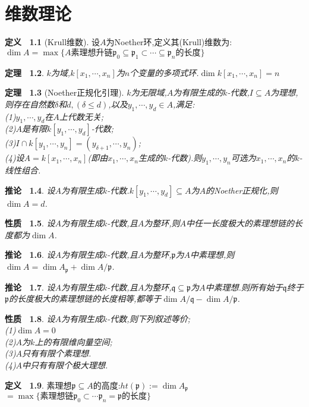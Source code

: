 \documentclass[b5paper,oneside]{ctexbook}
\newcommand{\mf}[1]{\mathfrak{#1}}
\theoremstyle{plain}
\newtheorem{thm}{定理~}[chapter]
\newtheorem{prop}[thm]{性质~}
\newtheorem{cor}[thm]{推论~}
\theoremstyle{definition}
\newtheorem{defn}[thm]{定义~}
\begin{document}
\chapter{维数理论}
\begin{defn}[Krull维数]设$A$为Noether环,定义其(Krull)维数为:\\
$\dim A=\max\{A\text{素理想升链}\mf{p}_0\subseteq \mf{p}_1\subset \cdots\subseteq \mf{p}_n\text{的长度}\}$
\end{defn}
\begin{thm}$k$为域,$k[x_1,\cdots,x_n]$为$n$个变量的多项式环.$\dim k[x_1,\cdots,x_n]=n$
\end{thm}
\begin{thm}[Noether正规化引理]$k$为无限域,$A$为有限生成的$k$-代数,$I\subseteq A$为理想,则存在自然数$\delta$和$d,(\delta\leq d)$,以及$y_1,\cdots,y_d\in A$,满足:\\
(1)$y_1,\cdots,y_d$在$A$上代数无关;\\
(2)$A$是有限$k[y_1,\cdots,y_d]$-代数;\\
(3)$I\cap k[y_1,\cdots,y_n]=(y_{\delta+1},\cdots,y_n)$;\\
(4)设$A=k[x_1,\cdots,x_n]$(即由$x_1,\cdots,x_n$生成的$k$-代数).则$y_1,\cdots,y_n$可选为$x_1,\cdots,x_n$的$k$-线性组合.
\end{thm}
\begin{cor}设$A$为有限生成$k$-代数.$k[y_1,\cdots,y_d]\subseteq A$为$A$的Noether正规化,则$\dim A=d$.
\end{cor}
\begin{prop}设$A$为有限生成$k$-代数,且$A$为整环,则$A$中任一长度极大的素理想链的长度都为$\dim A$.
\end{prop}
\begin{cor}设$A$为有限生成$k$-代数,且$A$为整环,$\mf{p}$为$A$中素理想,则$\dim A=\dim A_{\mf{p}}+\dim A/\mf{p}$.
\end{cor}
\begin{cor}设$A$为有限生成$k$-代数,且$A$为整环,$\mf{q}\subseteq \mf{p}$为$A$中素理想.则所有始于$\mf{q}$终于$\mf{p}$的长度极大的素理想链的长度相等,都等于$\dim A/\mf{q}-\dim A/\mf{p}$.
\end{cor}
\begin{prop}设$A$为有限生成$k$-代数,则下列叙述等价;\\
(1)$\dim A=0$\\
(2)$A$为$k$上的有限维向量空间;\\
(3)$A$只有有限个素理想.\\
(4)$A$中只有有限个极大理想.
\end{prop}
\begin{defn}素理想$\mf{p}\subseteq A$的高度:$ht(\mf{p}):=\dim A_{\mf{p}}$ $=\max\{\text{素理想链}\mf{p}_0 \subset \cdots \mf{p}_n=\mf{p}\text{的长度}\}$
\end{defn}
\end{document}
